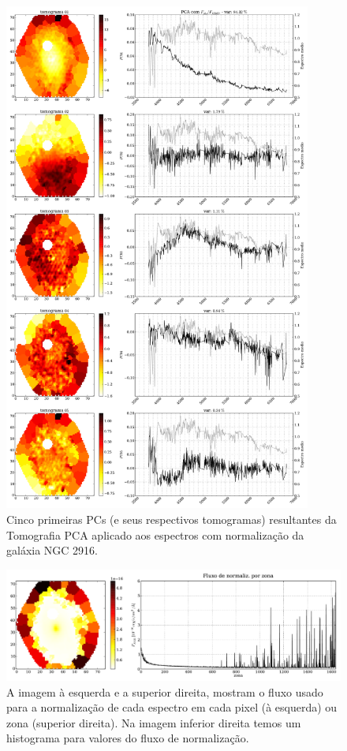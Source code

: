 \begin{figure}
    \includegraphics[width=0.9\textwidth]{figuras/K0277-tomo-obs-norm.pdf}
    \caption[Tomogramas de 1 a 5 da gal\'axia NGC 2916 - $F_{obs} / F_{\lambda 5365}$.]
    {Cinco primeiras PCs (e seus respectivos tomogramas) resultantes da Tomografia PCA aplicado aos espectros com
    normalização da galáxia NGC 2916.}
    \label{fig:cap4:K277tomofobsnorm}
\end{figure}

\begin{figure}
    \includegraphics[width=1.\textwidth]{figuras/K0277-fobs_norm.pdf}
    \caption[Fluxos de normalização para cada zona da galáxia K0277.]
    {A imagem à esquerda e a superior direita, mostram o fluxo usado para a normalização de cada espectro em
    cada pixel (à esquerda) ou zona (superior direita). Na imagem inferior direita temos um histograma para valores do
    fluxo de normalização.}
    \label{fig:cap4:K277fobsnorm}
\end{figure}

